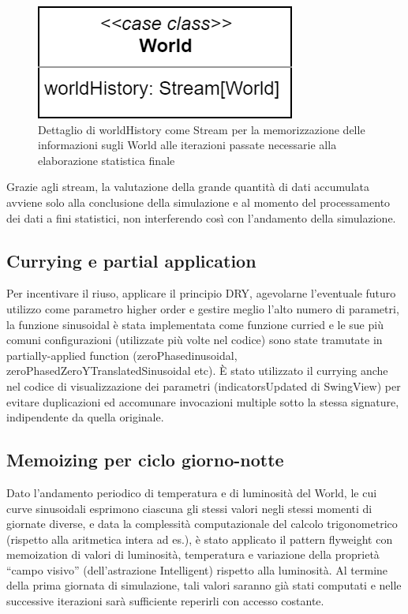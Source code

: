 \begin{figure}[h!]
\centering
\includegraphics[scale=0.30]{img/WorldDetail.png}
\caption{Dettaglio di worldHistory come Stream per la memorizzazione delle informazioni sugli World alle iterazioni passate necessarie alla elaborazione statistica finale}
\label{fig:worldDetail}
\end{figure}

Grazie agli stream, la valutazione della grande quantità di dati accumulata avviene solo alla conclusione della simulazione e al momento del processamento dei dati a fini statistici, non interferendo così con l’andamento della simulazione.

\subsection{Currying e partial application}
Per incentivare il riuso, applicare il principio DRY, agevolarne l’eventuale futuro utilizzo come parametro higher order e gestire meglio l’alto numero di parametri, la funzione sinusoidal è stata implementata come funzione curried e le sue più comuni configurazioni (utilizzate più volte nel codice) sono state tramutate in partially-applied function (zeroPhasedinusoidal, zeroPhasedZeroYTranslatedSinusoidal etc). È stato utilizzato il currying anche nel codice di visualizzazione dei parametri (indicatorsUpdated di SwingView) per evitare duplicazioni ed accomunare invocazioni multiple sotto la stessa signature, indipendente da quella originale.

\subsection{Memoizing per ciclo giorno-notte}
Dato l’andamento periodico di temperatura e di luminosità del World, le cui curve sinusoidali esprimono ciascuna gli stessi valori negli stessi momenti di giornate diverse, e data la complessità computazionale del calcolo trigonometrico (rispetto alla aritmetica intera ad es.), è stato applicato il pattern flyweight con memoization di valori di luminosità, temperatura e variazione della proprietà “campo visivo” (dell’astrazione Intelligent) rispetto alla luminosità. Al termine della prima giornata di simulazione, tali valori saranno già stati computati e nelle successive iterazioni sarà sufficiente reperirli con accesso costante.

